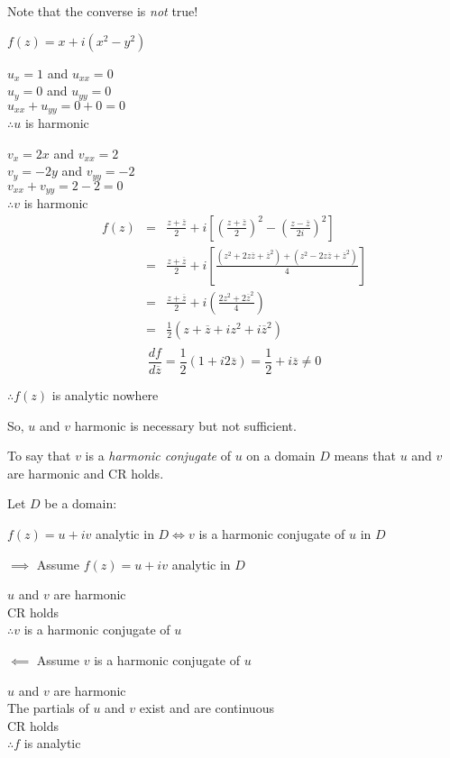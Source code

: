 \documentclass[letterpaper,12pt,fleqn]{article}
\newcommand{\conj}[1]{\overline{#1}}
\newcommand{\zb}{\conj{z}}
\begin{document}
Note that the converse is \emph{not} true!
\newpage
\begin{example}
  $f(z)=x+i(x^2-y^2)$

  $u_x=1$ and $u_{xx}=0$ \\
  $u_y=0$ and $u_{yy}=0$ \\
  $u_{xx}+u_{yy}=0+0=0$ \\
  $\therefore u$ is harmonic

  $v_x=2x$ and $v_{xx}=2$ \\
  $v_y=-2y$ and $v_{yy}=-2$ \\
  $v_{xx}+v_{yy}=2-2=0$ \\
  $\therefore v$ is harmonic
  \begin{eqnarray*}
    f(z) &=& \frac{z+\zb}{2}+i\left[
      \left(\frac{z+\zb}{2}\right)^2-
      \left(\frac{z-\zb}{2i}\right)^2\right] \\
    &=& \frac{z+\zb}{2}+i\left[
    \frac{(z^2+2z\zb+\zb^2)+(z^2-2z\zb+\zb^2)}{4}\right] \\
    &=& \frac{z+\zb}{2}+i\left(\frac{2z^2+2\zb^2}{4}\right) \\
    &=& \frac{1}{2}(z+\zb+iz^2+i\zb^2) \\
  \end{eqnarray*}
  \[\frac{df}{d\zb}=\frac{1}{2}(1+i2\zb)=\frac{1}{2}+i\zb\ne0\]

  $\therefore f(z)$ is analytic nowhere
\end{example}

So, $u$ and $v$ harmonic is necessary but not sufficient.

\begin{definition}
  To say that $v$ is a \emph{harmonic conjugate} of $u$ on a domain $D$ means
  that $u$ and $v$ are harmonic and CR holds.
\end{definition}

\begin{theorem}
  Let $D$ be a domain:

  $f(z)=u+iv$ analytic in $D\iff v$ is a harmonic conjugate of $u$ in $D$
\end{theorem}
\newpage
\begin{theproof}
  \listbreak
  \begin{description}
  \item $\implies$ Assume $f(z)=u+iv$ analytic in $D$

    $u$ and $v$ are harmonic \\
    CR holds \\
    $\therefore v$ is a harmonic conjugate of $u$

  \item $\impliedby$ Assume $v$ is a harmonic conjugate of $u$

    $u$ and $v$ are harmonic \\
    The partials of $u$ and $v$ exist and are continuous \\
    CR holds \\
    $\therefore f$ is analytic
  \end{description}
\end{theproof}
\end{document}
